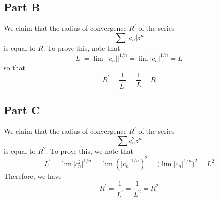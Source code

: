 \documentclass[12pt]{article}
\begin{document}
\subsection*{Part B}
We claim that the radius of convergence $R^\prime$ of the series
\[
\sum \vert c_n \vert z^n
\] is equal to $R$. To prove this, note that
\[
L^\prime = \lim \vert \vert c_n \vert \vert^{1/n} = \lim \vert c_n \vert^{1/n} = L
\] so that
\[
R^\prime = \frac{1}{L^\prime} = \frac{1}{L} = R
\]
\subsection*{Part C}
We claim that the radius of convergence $R^\prime$ of the series
\[
\sum c_n^2  z^n
\] is equal to $R^2$. To prove this, we note that
\[
L^\prime = \lim \vert c_n^2 \vert^{1/n} = \lim (\vert c_n \vert^{1/n})^2 = \big(\lim \vert c_n \vert^{1/n}\big)^2 = L^2
\] Therefore, we have
\[
R^\prime = \frac{1}{L^\prime} = \frac{1}{L^2} = R^2
\]
\end{document}
